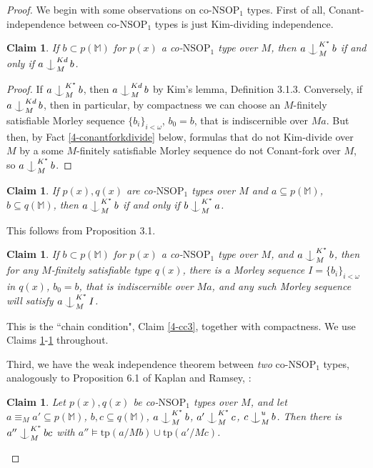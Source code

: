 \documentclass[12pt]{amsart}
\newtheorem{claim}[theorem]{Claim}
\theoremstyle{definition}
\def\Ind#1#2{#1\setbox0=\hbox{$#1x$}\kern\wd0\hbox to 0pt{\hss$#1\mid$\hss}
\lower.9\ht0\hbox to 0pt{\hss$#1\smile$\hss}\kern\wd0}
\def\ind{\mathop{\mathpalette\Ind{}}}
\begin{document}
\begin{proof}
    
We begin with some observations on co-$\mathrm{NSOP}_{1}$ types. First of all, Conant-independence between co-$\mathrm{NSOP}_{1}$ types is just Kim-dividing independence.

\begin{claim}\label{4-kd4}
If  $b \subset p(\mathbb{M})$ for $p(x)$ a co-$\mathrm{NSOP}_{1}$ type over $M$, then $a \ind^{K^{*}}_{M} b $ if and only if $a \ind^{Kd}_{M} b $.   
\end{claim}

\begin{proof}
   If $a \ind^{K^{*}}_{M} b $, then $a \ind^{Kd}_{M} b $ by Kim's lemma, Definition 3.1.3. Conversely, if $a \ind^{Kd}_{M} b $, then in particular, by compactness we can choose an $M$-finitely satisfiable Morley sequence $\{b_{i}\}_{i < \omega}$, $b_{0}=b$, that is indiscernible over $Ma$. But then, by Fact \ref{4-conantforkdivide} below, formulas that do not Kim-divide over $M$ by a some $M$-finitely satisfiable Morley sequence do not Conant-fork over $M$, so $a \ind^{K^{*}}_{M} b $. 
\end{proof}

\begin{claim}\label{4-symm4}
If $p(x), q(x)$ are co-$\mathrm{NSOP}_{1}$ types over $M$ and $a \subseteq p(\mathbb{M})$, $b \subseteq q(\mathbb{M})$, then $a\ind^{K^{*}}_{M}b$ if and only if $b\ind^{K^{*}}_{M}a$.    
\end{claim}

This follows from Proposition 3.1.

\begin{claim}\label{4-cc4}
If  $b \subset p(\mathbb{M})$ for $p(x)$ a co-$\mathrm{NSOP}_{1}$ type over $M$, and $a \ind^{K^{*}}_{M} b $, then for any $M$-finitely satisfiable type $q(x)$, there is a Morley sequence $I=\{b_{i}\}_{i < \omega}$ in $q(x)$, $b_{0} =b$, that is indiscernible over $Ma$, and any such Morley sequence will satisfy $a \ind^{K^{*}}_{M} I$. 
\end{claim}

This is the ``chain condition", Claim \ref{4-cc3}, together with compactness. We use Claims \ref{4-kd4}-\ref{4-cc4} throughout.



Third, we have the weak independence theorem between \textit{two} co-$\mathrm{NSOP}_{1}$ types, analogously to Proposition 6.1 of Kaplan and Ramsey, \cite{KR17}:

\begin{claim}\label{4-wit4}
 Let $p(x), q(x)$ be co-$\mathrm{NSOP}_{1}$ types over $M$, and let $a \equiv_{M} a' \subseteq p(\mathbb{M})$, $b, c \subseteq q(\mathbb{M})$, $a \ind^{K^{*}}_{M} b$, $a' \ind^{K^{*}}_{M} c$, $c \ind^{u}_{M} b$. Then there is $a'' \ind_{M}^{K^{*}} bc$  with $a'' \models \mathrm{tp}(a/Mb) \cup \mathrm{tp}(a'/Mc)$. 
\end{claim}


\end{proof}
\end{document}
